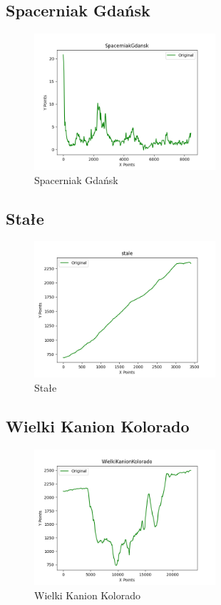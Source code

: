 \documentclass{article}
\begin{document}
\subsection{Spacerniak Gdańsk}

\begin{figure}[h]
    \centering
    \includegraphics[width=0.6\textwidth]{plots/SpacerniakGdansk_original.png}
    \caption{Spacerniak Gdańsk}
\end{figure}

\subsection{Stałe}

\begin{figure}[H]
    \centering
    \includegraphics[width=0.6\textwidth]{plots/stale_original.png}
    \caption{Stałe}
\end{figure}

\subsection{Wielki Kanion Kolorado}

\begin{figure}[H]
    \centering
    \includegraphics[width=0.6\textwidth]{plots/WielkiKanionKolorado_original.png}
    \caption{Wielki Kanion Kolorado}
\end{figure}
\end{document}
